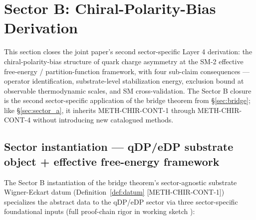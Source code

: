 \documentclass[11pt,letterpaper]{article}
\newcommand{\methref}[1]{\textsf{\small[\textsc{#1}]}}
\begin{document}
\section{Sector B: Chiral-Polarity-Bias Derivation}
\label{sec:sector_b}

This section closes the joint paper's second sector-specific Layer 4 derivation: the chiral-polarity-bias structure of quark charge asymmetry at the SM-2 effective free-energy / partition-function framework, with four sub-claim consequences --- operator identification, substrate-level stabilization energy, exclusion bound at observable thermodynamic scales, and SM cross-validation. The Sector B closure is the second sector-specific application of the bridge theorem from §\ref{sec:bridge}; like §\ref{sec:sector_a}, it inherits METH-CHIR-CONT-1 through METH-CHIR-CONT-4 without introducing new catalogued methods.

\subsection{Sector instantiation --- qDP/eDP substrate object + effective free-energy framework}
\label{sec:sector_b_instantiation}

The Sector B instantiation of the bridge theorem's sector-agnostic substrate Wigner-Eckart datum (Definition~\ref{def:datum} \methref{METH-CHIR-CONT-1}) specializes the abstract data to the qDP/eDP sector via three sector-specific foundational inputs (full proof-chain rigor in working sketch \cite{ChiContSketchB}):
\end{document}
